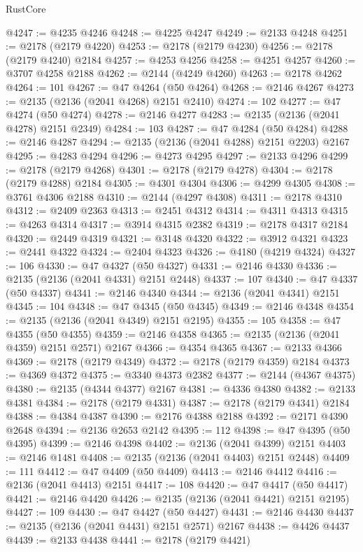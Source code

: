 \begin{lexlean}{RustCore}
\begin{coremodule}
@4247 := @4235 @4246
@4248 := @4225 @4247
@4249 := @2133 @4248
@4251 := @2178 (@2179 @4220)
@4253 := @2178 (@2179 @4230)
@4256 := @2178 (@2179 @4240) @2184
@4257 := @4253 @4256
@4258 := @4251 @4257
@4260 := @3707 @4258 @2188
@4262 := @2144 (@4249 @4260)
@4263 := @2178 @4262
@4264 := 101
@4267 := @47 @4264 (@50 @4264)
@4268 := @2146 @4267
@4273 := @2135 (@2136 (@2041 @4268) @2151 @2410)
@4274 := 102
@4277 := @47 @4274 (@50 @4274)
@4278 := @2146 @4277
@4283 := @2135 (@2136 (@2041 @4278) @2151 @2349)
@4284 := 103
@4287 := @47 @4284 (@50 @4284)
@4288 := @2146 @4287
@4294 := @2135 (@2136 (@2041 @4288) @2151 @2203) @2167
@4295 := @4283 @4294
@4296 := @4273 @4295
@4297 := @2133 @4296
@4299 := @2178 (@2179 @4268)
@4301 := @2178 (@2179 @4278)
@4304 := @2178 (@2179 @4288) @2184
@4305 := @4301 @4304
@4306 := @4299 @4305
@4308 := @3761 @4306 @2188
@4310 := @2144 (@4297 @4308)
@4311 := @2178 @4310
@4312 := @2409 @2363
@4313 := @2451 @4312
@4314 := @4311 @4313
@4315 := @4263 @4314
@4317 := @3914 @4315 @2382
@4319 := @2178 @4317 @2184
@4320 := @2449 @4319
@4321 := @3148 @4320
@4322 := @3912 @4321
@4323 := @2441 @4322
@4324 := @2404 @4323
@4326 := @4180 (@4219 @4324)
@4327 := 106
@4330 := @47 @4327 (@50 @4327)
@4331 := @2146 @4330
@4336 := @2135 (@2136 (@2041 @4331) @2151 @2448)
@4337 := 107
@4340 := @47 @4337 (@50 @4337)
@4341 := @2146 @4340
@4344 := @2136 (@2041 @4341) @2151
@4345 := 104
@4348 := @47 @4345 (@50 @4345)
@4349 := @2146 @4348
@4354 := @2135 (@2136 (@2041 @4349) @2151 @2195)
@4355 := 105
@4358 := @47 @4355 (@50 @4355)
@4359 := @2146 @4358
@4365 := @2135 (@2136 (@2041 @4359) @2151 @2571) @2167
@4366 := @4354 @4365
@4367 := @2133 @4366
@4369 := @2178 (@2179 @4349)
@4372 := @2178 (@2179 @4359) @2184
@4373 := @4369 @4372
@4375 := @3340 @4373 @2382
@4377 := @2144 (@4367 @4375)
@4380 := @2135 (@4344 @4377) @2167
@4381 := @4336 @4380
@4382 := @2133 @4381
@4384 := @2178 (@2179 @4331)
@4387 := @2178 (@2179 @4341) @2184
@4388 := @4384 @4387
@4390 := @2176 @4388 @2188
@4392 := @2171 @4390 @2648
@4394 := @2136 @2653 @2142
@4395 := 112
@4398 := @47 @4395 (@50 @4395)
@4399 := @2146 @4398
@4402 := @2136 (@2041 @4399) @2151
@4403 := @2146 @1481
@4408 := @2135 (@2136 (@2041 @4403) @2151 @2448)
@4409 := 111
@4412 := @47 @4409 (@50 @4409)
@4413 := @2146 @4412
@4416 := @2136 (@2041 @4413) @2151
@4417 := 108
@4420 := @47 @4417 (@50 @4417)
@4421 := @2146 @4420
@4426 := @2135 (@2136 (@2041 @4421) @2151 @2195)
@4427 := 109
@4430 := @47 @4427 (@50 @4427)
@4431 := @2146 @4430
@4437 := @2135 (@2136 (@2041 @4431) @2151 @2571) @2167
@4438 := @4426 @4437
@4439 := @2133 @4438
@4441 := @2178 (@2179 @4421)

\end{coremodule}
\end{lexlean}

